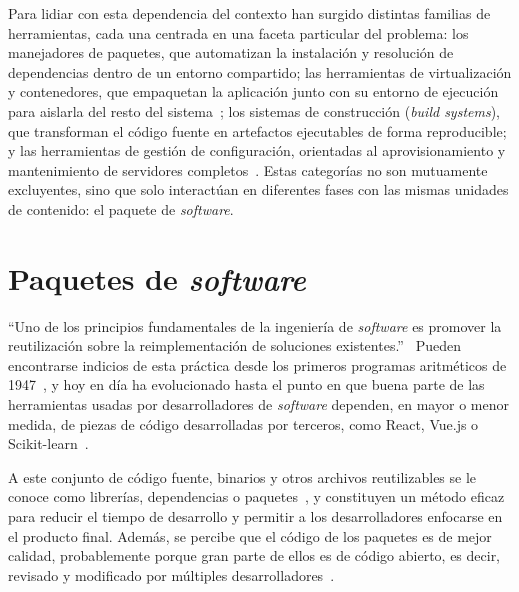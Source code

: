 Para lidiar con esta dependencia del contexto han surgido distintas familias de herramientas, cada una centrada en una faceta particular del problema: los manejadores de paquetes, que automatizan la instalación y resolución de dependencias dentro de un entorno compartido; las herramientas de virtualización y contenedores, que empaquetan la aplicación junto con su entorno de ejecución para aislarla del resto del sistema~\cite{Sobieraj2024,Lingayat2018}; los sistemas de construcción (\emph{build systems}), que transforman el código fuente en artefactos ejecutables de forma reproducible; y las herramientas de gestión de configuración, orientadas al aprovisionamiento y mantenimiento de servidores completos~\cite{Zwinger2026}. Estas categorías no son mutuamente excluyentes, sino que solo interactúan en diferentes fases con las mismas unidades de contenido: el paquete de \emph{software}.

\section{Paquetes de \emph{software}}

``Uno de los principios fundamentales de la ingeniería de \emph{software} es promover la reutilización sobre la reimplementación de soluciones existentes.''~\cite{jaimeAnalysisEvolutionDependencies} Pueden encontrarse indicios de esta práctica desde los primeros programas aritméticos de 1947~\cite{goldstainPlanningCodingProblems1947}, y hoy en día ha evolucionado hasta el punto en que buena parte de las herramientas usadas por desarrolladores de \emph{software} dependen, en mayor o menor medida, de piezas de código desarrolladas por terceros, como React, Vue.js o Scikit-learn~\cite{jaimeAnalysisEvolutionDependencies}.

A este conjunto de código fuente, binarios y otros archivos reutilizables se le conoce como librerías, dependencias o paquetes~\cite{mensSoftwareEcosystemsTooling2023}, y constituyen un método eficaz para reducir el tiempo de desarrollo y permitir a los desarrolladores enfocarse en el producto final. Además, se percibe que el código de los paquetes es de mejor calidad, probablemente porque gran parte de ellos es de código abierto, es decir, revisado y modificado por múltiples desarrolladores~\cite{societyGuideSoftwareEngineering2026}.

